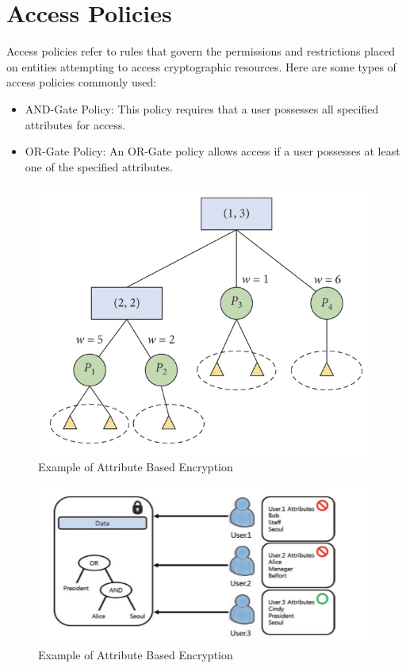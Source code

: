 \section{Access Policies}
Access policies refer to rules that govern the permissions and restrictions placed on entities attempting to access cryptographic resources. Here are some types of access policies commonly used:
\begin{itemize}

    \item\bm AND-Gate Policy: This policy requires that a user possesses all specified attributes for access.

    \item\bm OR-Gate Policy: An OR-Gate policy allows access if a user possesses at least one of the specified attributes.

\end{itemize}
\begin{figure}
    \centering
   \includegraphics[width=\linewidth]{Images/ABE.png}
    \caption{Example of Attribute Based Encryption}
    \label{fig:enter-label}
\end{figure}
\begin{figure}
    \centering
   \includegraphics[width=\linewidth]{Images/ANDOR.png}
    \caption{Example of Attribute Based Encryption}
    \label{fig:enter-label}
\end{figure}